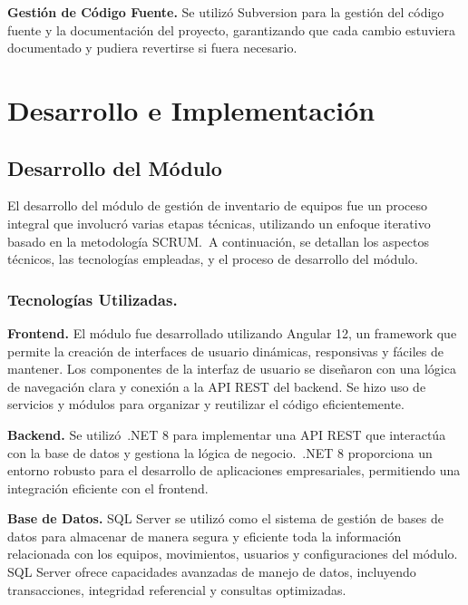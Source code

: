 \documentclass[stu, 12pt, letterpaper, donotrepeattitle, floatsintext, natbib]{apa7}
\begin{document}
\textbf{Gestión de Código Fuente. }Se utilizó Subversion para la gestión del código fuente y la documentación del proyecto, garantizando que
cada cambio estuviera documentado y pudiera revertirse si fuera necesario.
\newpage
\section{Desarrollo e Implementación}
\subsection{Desarrollo del Módulo}
El desarrollo del módulo de gestión de inventario de equipos fue un proceso integral que involucró varias etapas técnicas, utilizando un
enfoque iterativo basado en la metodología SCRUM.~A continuación, se detallan los aspectos técnicos, las tecnologías empleadas, y el proceso
de desarrollo del módulo.
\subsubsection{Tecnologías Utilizadas.}
\textbf{Frontend. }El módulo fue desarrollado utilizando Angular 12, un framework que permite la creación de interfaces de usuario dinámicas,
responsivas y fáciles de mantener. Los componentes de la interfaz de usuario se diseñaron con una lógica de navegación clara y conexión a la
API REST del backend. Se hizo uso de servicios y módulos para organizar y reutilizar el código eficientemente.

\textbf{Backend. }Se utilizó~.NET 8 para implementar una API REST que interactúa con la base de datos y gestiona la lógica de negocio.~.NET 8
proporciona un entorno robusto para el desarrollo de aplicaciones empresariales, permitiendo una integración eficiente con el frontend.

\textbf{Base de Datos. }SQL Server se utilizó como el sistema de gestión de bases de datos para almacenar de manera segura y eficiente toda la
información relacionada con los equipos, movimientos, usuarios y configuraciones del módulo. SQL Server ofrece capacidades avanzadas de manejo
de datos, incluyendo transacciones, integridad referencial y consultas optimizadas.
\end{document}
